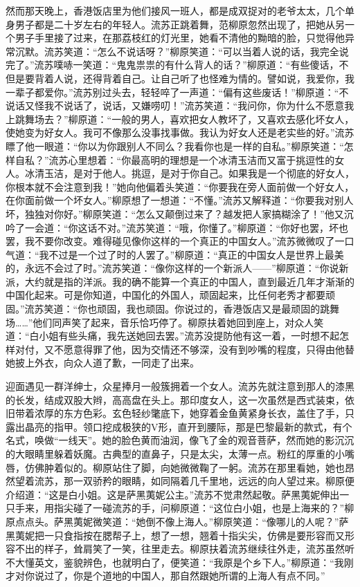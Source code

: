 \par 然而那天晚上，香港饭店里为他们接风一班人，都是成双捉对的老爷太太，几个单身男子都是二十岁左右的年轻人。流苏正跳着舞，范柳原忽然出现了，把她从另一个男子手里接了过来，在那荔枝红的灯光里，她看不清他的黝暗的脸，只觉得他异常沉默。流苏笑道：“怎么不说话呀？”柳原笑道：“可以当着人说的话，我完全说完了。”流苏噗哧一笑道：“鬼鬼祟祟的有什么背人的话？”柳原道：“有些傻话，不但是要背着人说，还得背着自己。让自己听了也怪难为情的。譬如说，我爱你，我一辈子都爱你。”流苏别过头去，轻轻啐了一声道：“偏有这些废话！”柳原道：“不说话又怪我不说话了，说话，又嫌唠叨！”流苏笑道：“我问你，你为什么不愿意我上跳舞场去？”柳原道：“一般的男人，喜欢把女人教坏了，又喜欢去感化坏女人，使她变为好女人。我可不像那么没事找事做。我认为好女人还是老实些的好。”流苏瞟了他一眼道：“你以为你跟别人不同么？我看你也是一样的自私。”柳原笑道：“怎样自私？”流苏心里想着：“你最高明的理想是一个冰清玉洁而又富于挑逗性的女人。冰清玉洁，是对于他人。挑逗，是对于你自己。如果我是一个彻底的好女人，你根本就不会注意到我！”她向他偏着头笑道：“你要我在旁人面前做一个好女人，在你面前做一个坏女人。”柳原想了一想道：“不懂。”流苏又解释道：“你要我对别人坏，独独对你好。”柳原笑道：“怎么又颠倒过来了？越发把人家搞糊涂了！”他又沉吟了一会道：“你这话不对。”流苏笑道：“哦，你懂了。”柳原道：“你好也罢，坏也罢，我不要你改变。难得碰见像你这样的一个真正的中国女人。”流苏微微叹了一口气道：“我不过是一个过了时的人罢了。”柳原道：“真正的中国女人是世界上最美的，永远不会过了时。”流苏笑道：“像你这样的一个新派人——”柳原道：“你说新派，大约就是指的洋派。我的确不能算一个真正的中国人，直到最近几年才渐渐的中国化起来。可是你知道，中国化的外国人，顽固起来，比任何老秀才都要顽固。”流苏笑道：“你也顽固，我也顽固。你说过的，香港饭店又是最顽固的跳舞场……”他们同声笑了起来，音乐恰巧停了。柳原扶着她回到座上，对众人笑道：“白小姐有些头痛，我先送她回去罢。”流苏没提防他有这一着，一时想不起怎样对付，又不愿意得罪了他，因为交情还不够深，没有到吵嘴的程度，只得由他替她披上外衣，向众人道了歉，一同走了出来。
\par 迎面遇见一群洋绅士，众星捧月一般簇拥着一个女人。流苏先就注意到那人的漆黑的长发，结成双股大辫，高高盘在头上。那印度女人，这一次虽然是西式装束，依旧带着浓厚的东方色彩。玄色轻纱氅底下，她穿着金鱼黄紧身长衣，盖住了手，只露出晶亮的指甲。领口挖成极狭的V形，直开到腰际，那是巴黎最新的款式，有个名式，唤做“一线天”。她的脸色黄而油润，像飞了金的观音菩萨，然而她的影沉沉的大眼睛里躲着妖魔。古典型的直鼻子，只是太尖，太薄一点。粉红的厚重的小嘴唇，仿佛肿着似的。柳原站住了脚，向她微微鞠了一躬。流苏在那里看她，她也昂然望着流苏，那一双骄矜的眼睛，如同隔着几千里地，远远的向人望过来。柳原便介绍道：“这是白小姐。这是萨黑荑妮公主。”流苏不觉肃然起敬。萨黑荑妮伸出一只手来，用指尖碰了一碰流苏的手，问柳原道：“这位白小姐，也是上海来的？”柳原点点头。萨黑荑妮微笑道：“她倒不像上海人。”柳原笑道：“像哪儿的人呢？”萨黑荑妮把一只食指按在腮帮子上，想了一想，翘着十指尖尖，仿佛是要形容而又形容不出的样子，耸肩笑了一笑，往里走去。柳原扶着流苏继续往外走，流苏虽然听不大懂英文，鉴貌辨色，也就明白了，便笑道：“我原是个乡下人。”柳原道：“我刚才对你说过了，你是个道地的中国人，那自然跟她所谓的上海人有点不同。”
